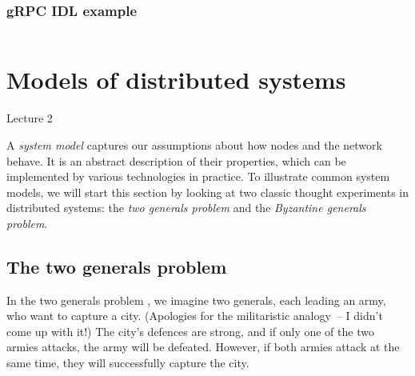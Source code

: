 \begin{frame}
    \label{s:rpc-idl}
    \frametitle{gRPC IDL example}
    \inputminted[fontsize=\scriptsize]{protobuf}{code/payment-rpc.proto}
\end{frame}
\label{l:rpc-idl}

%

\section{Models of distributed systems}\label{sec:system-models}

\begin{frame}
    \begin{center}
        Lecture 2\\[2em]
        \Large{\color{darkblue}{Models of distributed systems}}
    \end{center}
\end{frame}

A \emph{system model} captures our assumptions about how nodes and the network behave.
It is an abstract description of their properties, which can be implemented by various technologies in practice.
To illustrate common system models, we will start this section by looking at two classic thought experiments in distributed systems: the \emph{two generals problem} and the \emph{Byzantine generals problem}.

\subsection{The two generals problem}\label{sec:two-generals}

In the two generals problem \citep{Gray:1978}, we imagine two generals, each leading an army, who want to capture a city.
(Apologies for the militaristic analogy~-- I didn't come up with it!)
The city's defences are strong, and if only one of the two armies attacks, the army will be defeated.
However, if both armies attack at the same time, they will successfully capture the city.

